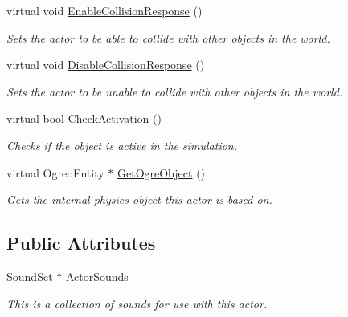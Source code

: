 \begin{DoxyCompactItemize}
virtual void \hyperlink{classphys_1_1ActorBase_a843f60f15435071c08d3cf2480f0ffeb}{EnableCollisionResponse} ()
\begin{DoxyCompactList}\small\item\em Sets the actor to be able to collide with other objects in the world. \item\end{DoxyCompactList}\item 
virtual void \hyperlink{classphys_1_1ActorBase_a23b32c9a9959a9d3b0f883d9b0eac460}{DisableCollisionResponse} ()
\begin{DoxyCompactList}\small\item\em Sets the actor to be unable to collide with other objects in the world. \item\end{DoxyCompactList}\item 
virtual bool \hyperlink{classphys_1_1ActorBase_aacf6737ed91267cb4aa54d4c33eb1ad0}{CheckActivation} ()
\begin{DoxyCompactList}\small\item\em Checks if the object is active in the simulation. \item\end{DoxyCompactList}\item 
virtual Ogre::Entity $\ast$ \hyperlink{classphys_1_1ActorBase_aeecbf5005d2ae29e037a0271258ba6d8}{GetOgreObject} ()
\begin{DoxyCompactList}\small\item\em Gets the internal physics object this actor is based on. \item\end{DoxyCompactList}\end{DoxyCompactItemize}
\subsection*{Public Attributes}
\begin{DoxyCompactItemize}
\item 
\hypertarget{classphys_1_1ActorBase_a2d56e2b3470bfc7dfc6d9ce8c4158d81}{
\hyperlink{namespacephys_ab780c3162da5699fe421f3739ba03fc4}{SoundSet} $\ast$ \hyperlink{classphys_1_1ActorBase_a2d56e2b3470bfc7dfc6d9ce8c4158d81}{ActorSounds}}
\label{d8/d0f/classphys_1_1ActorBase_a2d56e2b3470bfc7dfc6d9ce8c4158d81}

\begin{DoxyCompactList}\small\item\em This is a collection of sounds for use with this actor. \item\end{DoxyCompactList}\end{DoxyCompactItemize}
